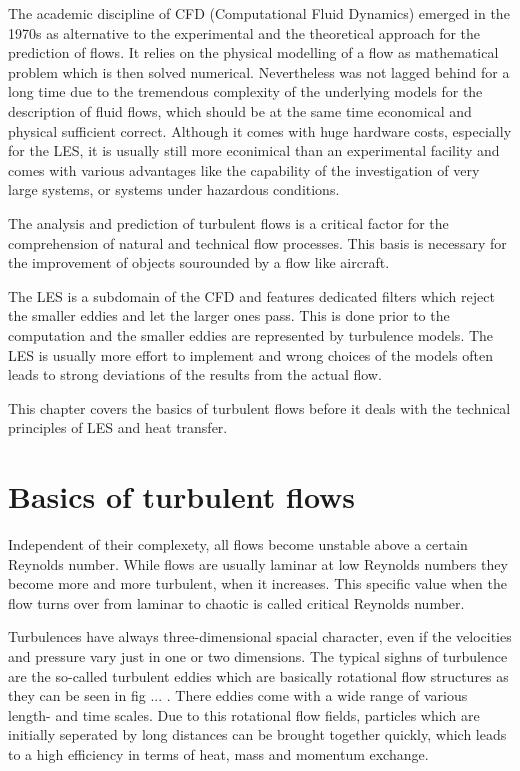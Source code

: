 The academic discipline of CFD (Computational Fluid Dynamics) emerged in the 1970s as alternative to the experimental and the theoretical approach for the prediction of flows. It relies on the physical modelling of a flow as mathematical problem which is then solved numerical. Nevertheless was not lagged behind for a long time due to the tremendous complexity of the underlying models for the description of fluid flows, which should be at the same time economical and physical sufficient correct. Although it comes with huge hardware costs, especially for the LES, it is usually still more econimical than an experimental facility and comes with various advantages like the capability of the investigation of very large systems, or systems under hazardous conditions.

The analysis and prediction of turbulent flows is a critical factor for the comprehension of natural and technical flow processes. This basis is necessary for the improvement of objects sourounded by a flow like aircraft.

The LES is a subdomain of the CFD and features dedicated filters which reject the smaller eddies and let the larger ones pass. This is done prior to the computation and the smaller eddies are represented by turbulence models. The LES is usually more effort to implement and wrong choices of the models often leads to strong deviations of the results from the actual flow.

This chapter covers the basics of turbulent flows before it deals with the technical principles of LES and heat transfer.

\section{Basics of turbulent flows}
Independent of their complexety, all flows become unstable above a certain Reynolds number. While flows are usually laminar at low Reynolds numbers they become more and more turbulent, when it increases. This specific value when the flow turns over from laminar to chaotic is called critical Reynolds number.

Turbulences have always three-dimensional spacial character, even if the velocities and pressure vary just in one or two dimensions. The typical sighns of turbulence are the so-called turbulent eddies which are basically rotational flow structures as they can be seen in fig ... . There eddies come with a wide range of various length- and time scales. Due to this rotational flow fields, particles which are initially seperated by long distances can be brought together quickly, which leads to a high efficiency in terms of heat, mass and momentum exchange.

